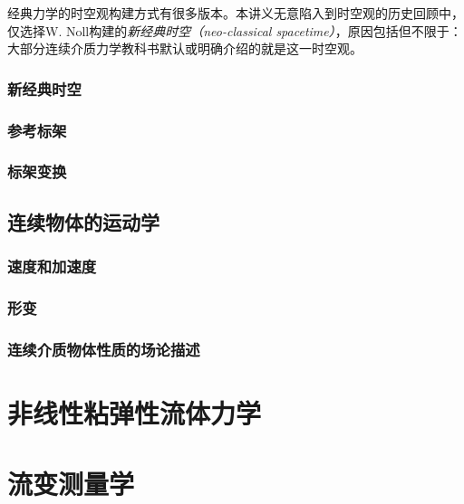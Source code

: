 \documentclass[
  zihao=5,
  a4paper,
  heading=true,
  twoside
]{ctexbook}
\theoremstyle{definition}
\theoremstyle{plain}
\begin{document}
经典力学的时空观构建方式有很多版本\cite{Weatherall2022}。本讲义无意陷入到时空观的历史回顾中，仅选择W. Noll\cite{Noll1973}构建的\emph{新经典时空（neo-classical spacetime）}，原因包括但不限于：大部分连续介质力学教科书默认或明确介绍的就是这一时空观。
\section{新经典时空}\label{sec:III.1.1}

\section{参考标架}\label{sec:III.1.2}

\section{标架变换}\label{sec:III.1.3}


\chapter{连续物体的运动学}\label{sec:III.2}
\section{速度和加速度}\label{sec:III.2.1}

\section{形变}\label{sec:III.2.2}

\section{连续介质物体性质的场论描述}\label{sec:III.2.3}


\part{非线性粘弹性流体力学}
\part{流变测量学}


%

%
\end{document}
